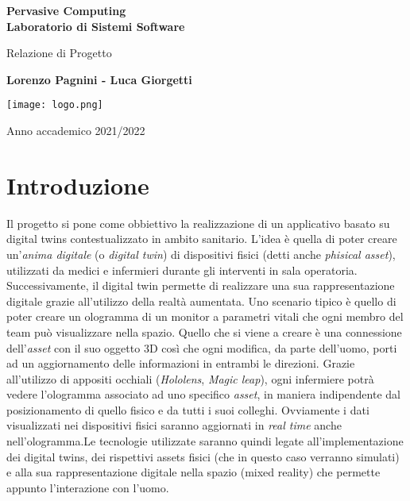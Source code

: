 \documentclass{report}
\begin{document}
\hypersetup{linkcolor=black}

\tableofcontents

\begin{titlepage}
    \begin{center}
        \vspace*{1cm}
        
        \Huge
        \textbf{Pervasive Computing \\ Laboratorio di Sistemi Software}
        
        \vspace{0.5cm}
        \LARGE
        Relazione di Progetto
        
        \vspace{1.0cm}
        \textbf{Lorenzo Pagnini - Luca Giorgetti}
        
        \vspace{1.5cm}
        \texttt{[image: logo.png]}
        
        \vspace{0.5cm}
        \LARGE
        Anno accademico 2021/2022
    
    \end{center}
\end{titlepage}

\chapter{Introduzione}
Il progetto si pone come obbiettivo la realizzazione di un applicativo basato su digital twins contestualizzato in ambito sanitario. L'idea è quella di poter creare un'\textit{anima digitale} (o \textit{digital twin}) di dispositivi fisici (detti anche \textit{phisical asset}), utilizzati da medici e infermieri durante gli interventi in sala operatoria. Successivamente, il digital twin permette di realizzare una sua rappresentazione digitale grazie all'utilizzo della realtà aumentata. Uno scenario tipico è quello di poter creare un ologramma di un monitor a parametri vitali che ogni membro del team può visualizzare nella spazio. Quello che si viene a creare è una connessione dell'\textit{asset} con il suo oggetto 3D così che ogni modifica, da parte dell'uomo, porti ad un aggiornamento delle informazioni in entrambi le direzioni. Grazie all'utilizzo di appositi occhiali (\textit{Hololens}, \textit{Magic leap}), ogni infermiere potrà vedere l'ologramma associato ad uno specifico \textit{asset}, in maniera indipendente dal posizionamento di quello fisico e da tutti i suoi colleghi. Ovviamente i dati visualizzati nei dispositivi fisici saranno aggiornati in \textit{real time} anche nell'ologramma.\newline \newline Le tecnologie utilizzate saranno quindi legate all'implementazione dei digital twins, dei rispettivi assets fisici (che in questo caso verranno simulati) e alla sua rappresentazione digitale nella spazio (mixed reality) che permette appunto l'interazione con l'uomo.
\end{document}
